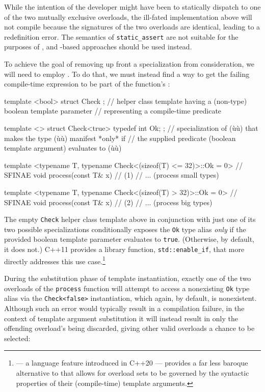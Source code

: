 \noindent While the intention of the developer might have been to statically
dispatch to one of the two mutually exclusive overloads, the ill-fated
implementation above will not compile because the signatures of the two
overloads are identical, leading to a redefinition error. The semantics
of \lstinline!static_assert! are not suitable for the purposes of
, and -based approaches should be used instead.

To achieve the goal of removing up
front a specialization from consideration, we will need to employ
. To do that, we must instead find a way to get the
failing compile-time expression to be part of the function's
:

\begin{emcppslisting}[emcppsbatch=e6]
template <bool> struct Check { };
    // helper class template having a (non-type) boolean template parameter
    // representing a compile-time predicate

template <> struct Check<true> { typedef int Ok; };
    // specialization of (ù{}ù) that makes the type (ù{}ù) manifest *only* if
    // the supplied predicate (boolean template argument) evaluates to (ù{}ù)

template <typename T,
          typename Check<(sizeof(T) <= 32)>::Ok = 0>  // SFINAE
void process(const T& x)  // (1)
{
    // ... (process small types)
}

template <typename T,
          typename Check<(sizeof(T) > 32)>::Ok = 0>  // SFINAE
void process(const T& x)  // (2)
{
    // ... (process big types)
}
\end{emcppslisting}

\noindent The empty \lstinline!Check! helper class template above in conjunction with
just one of its two possible specializations conditionally
exposes the \lstinline!Ok! type alias \emph{only} if the provided boolean
template parameter evaluates to \lstinline!true!. (Otherwise, by default, it
does not.) C++11 provides a library function, \lstinline!std::enable_if!, that more directly addresses this use case.\footnote{ --- a
language feature introduced in C++20 --- provides a far less baroque
alternative to  that allows for overload sets to be governed by
  the syntactic properties of their (compile-time) template arguments.}

During the substitution phase of template instantiation,
exactly one of the two overloads of the \lstinline!process! function will
attempt to access a nonexisting \lstinline!Ok! type alias via the
\lstinline!Check<false>! instantiation, which again, by default, is
nonexistent. Although such an error would typically result in a
compilation failure, in the context of template argument substitution it
will instead result in only the offending overload's being discarded,
giving other valid overloads a chance to be selected:

